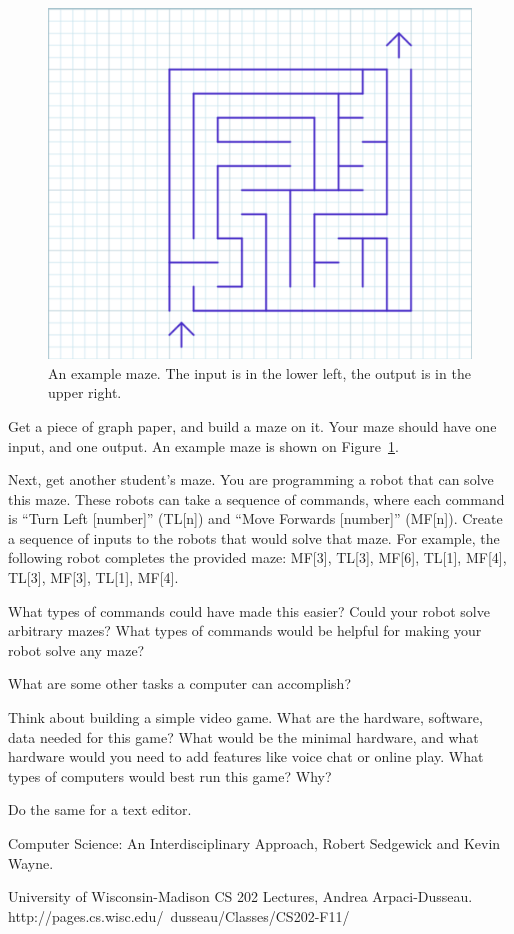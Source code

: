 \begin{figure}
  \centering
    \includegraphics[scale=.4]{graph-paper.png}
    \caption{An example maze. The input is in the lower left, the output is in
      the upper right.}
    \label{fig:graph-paper}
\end{figure}

\begin{exercise}
  Get a piece of graph paper, and build a maze on it. Your maze should have one
  input, and one output. An example maze is shown on
  Figure~\ref{fig:graph-paper}.

  Next, get another student's maze. You are programming a robot that can solve
  this maze. These robots can take a sequence of commands, where each command is
  ``Turn Left [number]'' (TL[n]) and ``Move Forwards [number]'' (MF[n]). Create
  a sequence of inputs to the robots that would solve that maze. For example,
  the following robot completes the provided maze: MF[3], TL[3], MF[6], TL[1],
  MF[4], TL[3], MF[3], TL[1], MF[4].

  What types of commands could have made this easier? Could your robot solve
  arbitrary mazes? What types of commands would be helpful for making your robot
  solve any maze?
\end{exercise}

\begin{exercise}
What are some other tasks a computer can accomplish?
\end{exercise}

\begin{exercise}
  Think about building a simple video game. What are the hardware, software,
  data needed for this game? What would be the minimal hardware, and what
  hardware would you need to add features like voice chat or online play. What
  types of computers would best run this game? Why?

  Do the same for a text editor.
\end{exercise}



Computer Science: An Interdisciplinary Approach, Robert Sedgewick and Kevin Wayne.

University of Wisconsin-Madison CS 202 Lectures, Andrea Arpaci-Dusseau.\\http://pages.cs.wisc.edu/~dusseau/Classes/CS202-F11/
